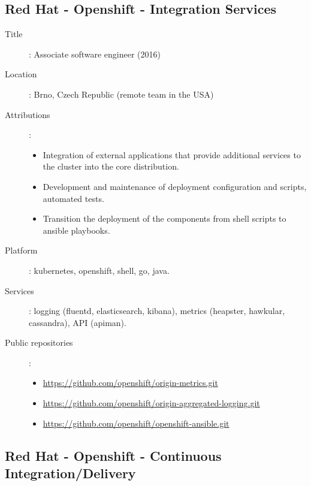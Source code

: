 \subsection*{Red Hat - Openshift - Integration Services}

\begin{description}
    \item[Title]: Associate software engineer (2016)
    \item[Location]: Brno, Czech Republic (remote team in the USA)
    \item[Attributions]:
        \begin{itemize}
            \item
                Integration of external applications that provide additional
                services to the cluster into the core distribution.
            \item
                Development and maintenance of deployment configuration and
                scripts, automated tests.
            \item
                Transition the deployment of the components from shell scripts
                to ansible playbooks.
        \end{itemize}
    \item[Platform]: kubernetes, openshift, shell, go, java.
    \item[Services]:
        logging (fluentd, elasticsearch, kibana), metrics (heapster, hawkular,
        cassandra), API (apiman).
    \item[Public repositories]:
        \begin{itemize}
            \item \url{https://github.com/openshift/origin-metrics.git}
            \item \url{https://github.com/openshift/origin-aggregated-logging.git}
            \item \url{https://github.com/openshift/openshift-ansible.git}
        \end{itemize}
\end{description}

\subsection*{Red Hat - Openshift - Continuous Integration/Delivery}

